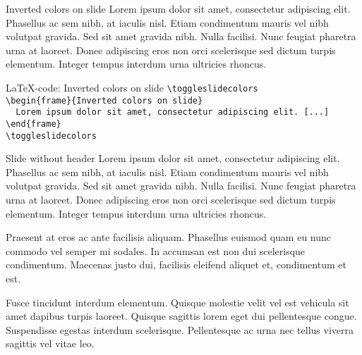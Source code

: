 \toggleslidecolors
\begin{frame}{Inverted colors on slide}
Lorem ipsum dolor sit amet, consectetur adipiscing elit. Phasellus ac sem nibh, at iaculis nisl. Etiam condimentum mauris vel nibh volutpat gravida. Sed sit amet gravida nibh. Nulla facilisi. Nunc feugiat pharetra urna at laoreet. Donec adipiscing eros non orci scelerisque sed dictum turpis elementum. Integer tempus interdum urna ultricies rhoncus.
\end{frame}
\toggleslidecolors

\toggleslidecolors
\begin{frame}[fragile]{\LaTeX-code: Inverted colors on slide}
\footnotesize
\verb|\toggleslidecolors|\\
\verb|\begin{frame}{Inverted colors on slide}|\\
\verb|  Lorem ipsum dolor sit amet, consectetur adipiscing elit. [...]|\\
\verb|\end{frame}|\\
\verb|\toggleslidecolors|\\
\end{frame}
\toggleslidecolors

{
\begin{frame}[plain]{Slide without header}
Lorem ipsum dolor sit amet, consectetur adipiscing elit. Phasellus ac sem nibh, at iaculis nisl. Etiam condimentum mauris vel nibh volutpat gravida. Sed sit amet gravida nibh. Nulla facilisi. Nunc feugiat pharetra urna at laoreet. Donec adipiscing eros non orci scelerisque sed dictum turpis elementum. Integer tempus interdum urna ultricies rhoncus.
\vspace{\baselineskip}

Praesent at eros ac ante facilisis aliquam. Phasellus euismod quam eu nunc commodo vel semper mi sodales. In accumsan est non dui scelerisque condimentum. Maecenas justo dui, facilisis eleifend aliquet et, condimentum et est.
\vspace{\baselineskip}

Fusce tincidunt interdum elementum. Quisque molestie velit vel est vehicula sit amet dapibus turpis laoreet. Quisque sagittis lorem eget dui pellentesque congue. Suspendisse egestas interdum scelerisque. Pellentesque ac urna nec tellus viverra sagittis vel vitae leo.
\end{frame}
}

